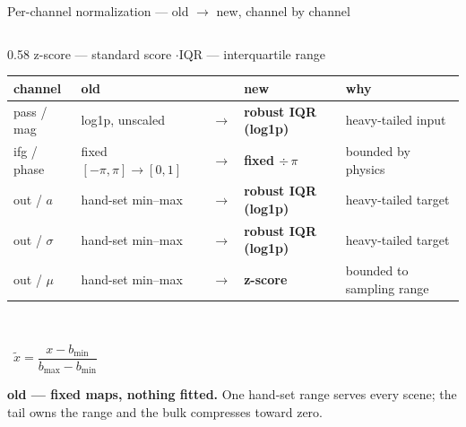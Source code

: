 \begin{frame}{Per-channel normalization --- old $\to$ new, channel by channel}
  \begin{columns}[c]
    \begin{column}{0.58\textwidth}
      \centering
      \scriptsize
      \renewcommand{\arraystretch}{1.75}
      \setlength{\tabcolsep}{3pt}
      {\color{soft} z-score --- standard score \quad$\cdot$\quad IQR --- interquartile range}\\[5pt]
      \begin{tabular}{@{}l l c l l@{}}
        \toprule
        channel & old & & new & why \\
        \midrule
        pass / mag     & \textcolor{soft}{log1p, unscaled}            & $\to$ & \textbf{\textcolor{accent}{robust IQR (log1p)}} & heavy-tailed input \\
        ifg / phase    & \textcolor{soft}{fixed $[-\pi,\pi]\to[0,1]$} & $\to$ & \textbf{\textcolor{good}{fixed $\div\,\pi$}}    & bounded by physics \\
        \addlinespace
        out / $a$      & \textcolor{soft}{hand-set min--max}          & $\to$ & \textbf{\textcolor{accent}{robust IQR (log1p)}} & heavy-tailed target \\
        out / $\sigma$ & \textcolor{soft}{hand-set min--max}          & $\to$ & \textbf{\textcolor{accent}{robust IQR (log1p)}} & heavy-tailed target \\
        out / $\mu$    & \textcolor{soft}{hand-set min--max}          & $\to$ & \textbf{z-score}                                & bounded to sampling range \\
        \bottomrule
      \end{tabular}
      \\[19pt]
      \begin{minipage}[c]{0.36\linewidth}
        \centering
        \mbox{\small\color{soft} $\tilde x = \dfrac{x - b_{\min}}{b_{\max} - b_{\min}}$}
      \end{minipage}\hfill
      \begin{minipage}[c]{0.60\linewidth}
        \scriptsize\color{soft}
        \textbf{old --- fixed maps, nothing fitted.} One hand-set range serves every scene; the tail owns the range and the bulk compresses toward zero.\par
      \end{minipage}
      \\[9pt]
      \begin{minipage}[c]{0.36\linewidth}

\end{minipage}
\end{column}
\end{columns}
\end{frame}

